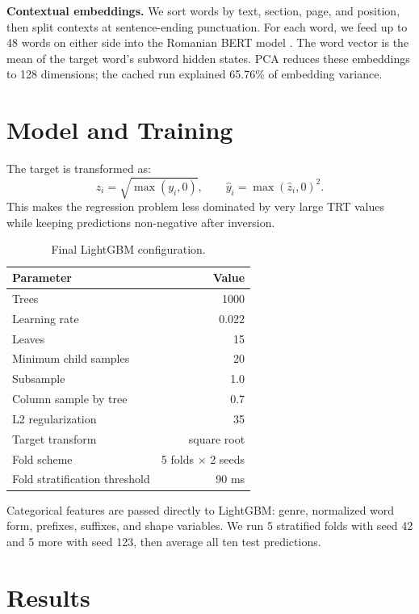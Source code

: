 \documentclass[10pt]{article}
\begin{document}
\textbf{Contextual embeddings.}
We sort words by text, section, page, and position, then split contexts at sentence-ending punctuation. For each word, we feed up to 48 words on either side into the Romanian BERT model . The word vector is the mean of the target word's subword hidden states. PCA reduces these embeddings to 128 dimensions; the cached run explained 65.76\% of embedding variance.
\FloatBarrier

\section{Model and Training}

The target is transformed as:
\begin{equation}
  z_i = \sqrt{\max(y_i,0)}, \qquad \hat y_i = \max(\hat z_i,0)^2.
\end{equation}
This makes the regression problem less dominated by very large TRT values while keeping predictions non-negative after inversion.

\begin{table}[H]
\centering
\caption{Final LightGBM configuration.}
\label{tab:model}
\begin{tabular}{lr}
\toprule
Parameter & Value \\
\midrule
Trees & 1000 \\
Learning rate & 0.022 \\
Leaves & 15 \\
Minimum child samples & 20 \\
Subsample & 1.0 \\
Column sample by tree & 0.7 \\
L2 regularization & 35 \\
Target transform & square root \\
Fold scheme & 5 folds $\times$ 2 seeds \\
Fold stratification threshold & 90 ms \\
\bottomrule
\end{tabular}
\end{table}

Categorical features are passed directly to LightGBM: genre, normalized word form, prefixes, suffixes, and shape variables. We run 5 stratified folds with seed 42 and 5 more with seed 123, then average all ten test predictions.

\section{Results}
\end{document}
